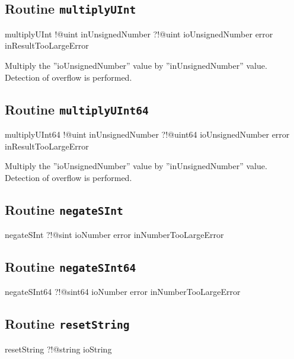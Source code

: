 {\subsection{Routine \texttt{multiplyUInt}}

\begin{galgascode}
multiplyUInt !@uint inUnsignedNumber
             ?!@uint ioUnsignedNumber
             error inResultTooLargeError
\end{galgascode}

Multiply the ''ioUnsignedNumber'' value by ''inUnsignedNumber'' value. Detection of overflow is performed.

\subsection{Routine \texttt{multiplyUInt64}}

\begin{galgascode}
multiplyUInt64 !@uint inUnsignedNumber
               ?!@uint64 ioUnsignedNumber
               error inResultTooLargeError
\end{galgascode}

Multiply the ''ioUnsignedNumber'' value by ''inUnsignedNumber'' value. Detection of overflow is performed.

\subsection{Routine \texttt{negateSInt}}

\begin{galgascode}
negateSInt ?!@sint ioNumber
           error inNumberTooLargeError
\end{galgascode}

\subsection{Routine \texttt{negateSInt64}}

\begin{galgascode}
negateSInt64 ?!@sint64 ioNumber
             error inNumberTooLargeError
\end{galgascode}


\subsection{Routine \texttt{resetString}}

\begin{galgascode}
resetString ?!@string ioString
\end{galgascode}








}
